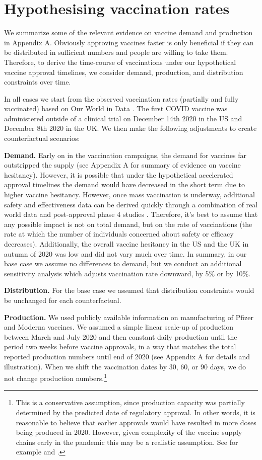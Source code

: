 \documentclass{article}
\begin{document}
\section{Hypothesising vaccination rates}\label{hypothesising-vaccination-rates}

We summarize some of the relevant evidence on vaccine demand and production in Appendix A. Obviously approving vaccines faster is only beneficial if they can be distributed in sufficient numbers and people are willing to take them. Therefore, to derive the time-course of vaccinations under our hypothetical vaccine approval timelines, we consider demand, production, and distribution constraints over time.

In all cases we start from the observed vaccination rates (partially and fully vaccinated) based on Our World in Data \citep{Mathieu2021Aglobal}. The first COVID vaccine was administered outside of a clinical trial on December 14th 2020 in the US and December 8th 2020 in the UK. We then make the following adjustments to create counterfactual scenarios:

\textbf{Demand.} Early on in the vaccination campaigns, the demand for vaccines far outstripped the supply (see Appendix A for summary of evidence on vaccine hesitancy). However, it is possible that under the hypothetical accelerated approval timelines the demand would have decreased in the short term due to higher vaccine hesitancy. However, once mass vaccination is underway, additional safety and effectiveness data can be derived quickly through a combination of real world data and post-approval phase 4 studies \citep{Dagan2021BNT162b2}. Therefore, it's best to assume that any possible impact is not on total demand, but on the rate of vaccinations (the rate at which the number of individuals concerned about safety or efficacy decreases). Additionally, the overall vaccine hesitancy in the US and the UK in autumn of 2020 was low and did not vary much over time. In summary, in our base case we assume no differences to demand, but we conduct an additional sensitivity analysis which adjusts vaccination rate downward, by 5\% or by 10\%.

\textbf{Distribution. }For the base case we assumed that distribution constraints would be unchanged for each counterfactual.

\textbf{Production.} We used publicly available information on manufacturing of Pfizer and Moderna vaccines. We assumed a simple linear scale-up of production between March and July 2020 and then constant daily production until the period two weeks before vaccine approvals, in a way that matches the total reported production numbers until end of 2020 (see Appendix A for details and illustration). When we shift the vaccination dates by 30, 60, or 90 days, we do not change production numbers.\footnote{This is a conservative assumption, since production capacity was partially determined by the predicted date of regulatory approval. In other words, it is reasonable to believe that earlier approvals would have resulted in more doses being produced in 2020. However, given complexity of the vaccine supply chains early in the pandemic this may be a realistic assumption. See for example \citet{Bown2022How} and \citet{Kominers2022Vaccines}.}
\end{document}
